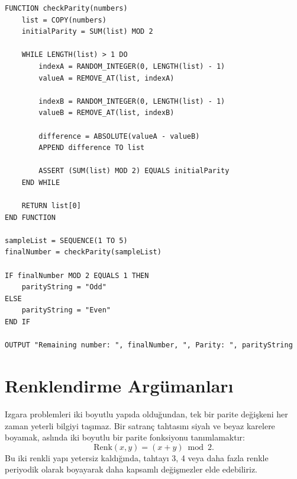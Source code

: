 \begin{lstlisting}
FUNCTION checkParity(numbers)
    list = COPY(numbers)
    initialParity = SUM(list) MOD 2
    
    WHILE LENGTH(list) > 1 DO
        indexA = RANDOM_INTEGER(0, LENGTH(list) - 1)
        valueA = REMOVE_AT(list, indexA)
        
        indexB = RANDOM_INTEGER(0, LENGTH(list) - 1)
        valueB = REMOVE_AT(list, indexB)
        
        difference = ABSOLUTE(valueA - valueB)
        APPEND difference TO list
        
        ASSERT (SUM(list) MOD 2) EQUALS initialParity
    END WHILE
    
    RETURN list[0]
END FUNCTION

sampleList = SEQUENCE(1 TO 5)
finalNumber = checkParity(sampleList)

IF finalNumber MOD 2 EQUALS 1 THEN
    parityString = "Odd"
ELSE
    parityString = "Even"
END IF

OUTPUT "Remaining number: ", finalNumber, ", Parity: ", parityString\end{lstlisting}

\begin{center}
\end{center}

\section{Renklendirme Argümanları}

Izgara problemleri iki boyutlu yapıda olduğundan, tek bir parite değişkeni her zaman yeterli bilgiyi taşımaz. Bir satranç tahtasını siyah ve beyaz karelere boyamak, aslında iki boyutlu bir parite fonksiyonu tanımlamaktır:
\[
\text{Renk}(x, y) = (x + y) \bmod 2.
\]
Bu iki renkli yapı yetersiz kaldığında, tahtayı 3, 4 veya daha fazla renkle periyodik olarak boyayarak daha kapsamlı değişmezler elde edebiliriz.

